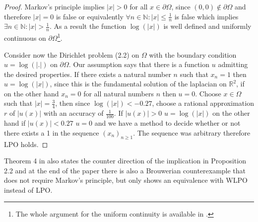 \documentclass[11pt,a4paper,leqno]{report}
\numberwithin{equation}{chapter}
\begin{document}
\begin{proof}
Markov's principle implies $|x|>0$ for all $x\in\partial\Omega$, since $(0,0)\notin\partial\Omega$ and therefore $|x|=0$ is false or equivalently $\forall n\in\mathbb{N}: |x|\leq\frac{1}{n}$ is false which implies $\exists n\in\mathbb{N}: |x|>\frac{1}{n}$. As a result the function $\log(|x|)$ is well defined and uniformly continuous on $\partial\Omega$\footnote{The whole argument for the uniform continuity is available in \cite{SDPC}.}. 

Consider now the Dirichlet problem (2.2) on $\Omega$ with the boundary condition $u=\log(|.|)$ on $\partial\Omega$. Our assumption says that there is a function $u$ admitting the desired properties. If there exists a natural number $n$ such that $x_n=1$ then $u=\log(|x|)$, since this is the fundamental solution of the laplacian on $\mathbb{R}^2$, if on the other hand $x_n=0$ for all natural numbers $n$ then $u=0$. Choose $x\in\Omega$ such that $|x|=\frac{3}{4}$, then since $\log(|x|)<-0.27$, choose a rational approximation $r$ of $|u(x)|$ with an accuracy of $\frac{1}{100}$. If $|u(x)|>0$ $u=\log(|x|)$ on the other hand if $|u(x)|<0.27$ $u=0$ and we have a method to decide whether or not there exists a 1 in the sequence $(x_n)_{n\geq 1}$. The sequence was arbitrary therefore LPO holds.
\end{proof}
Theorem 4 in \cite{SDPC} also states the counter direction of the implication in Proposition 2.2 and at the end of the paper there is also a Brouwerian counterexample that does not require Markov's principle, but only shows an equivalence with WLPO instead of LPO. 
\end{document}
